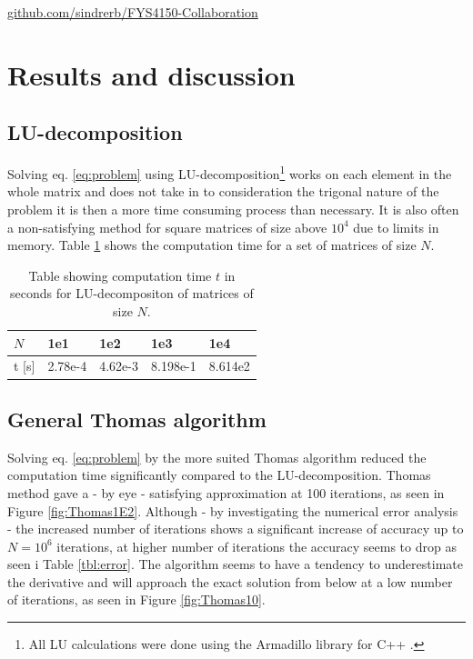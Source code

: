 \documentclass[twoside,twocolumn]{article}
\begin{document}
\begin{center}
 \href{https://github.com/sindrerb/FYS4150-Collaboration/tree/master/Doc/Project1}{github.com/sindrerb/FYS4150-Collaboration}
\end{center}

\section{Results and discussion}

\subsection{LU-decomposition}

Solving eq. \ref{eq:problem} using LU-decomposition\footnote{All LU calculations were done using the Armadillo library for C++ \cite{arma}.} works on each element in the whole matrix and does not take in to consideration the trigonal nature of the problem it is then a more time consuming process than necessary. It is also often a non-satisfying method for square matrices of size above $10^4$ due to limits in memory. Table \ref{tbl:time_LU} shows the computation time for a set of matrices of size $N$.

\begin{table}[h]
\begin{tabular}{|l|l|l|l|l|} \hline
$N$ & 1e1 & 1e2 & 1e3 & 1e4\\ \hline
t [s] & 2.78e-4 &4.62e-3 & 8.198e-1 & 8.614e2\\ \hline
\end{tabular}
\caption{Table showing computation time $t$ in seconds for LU-decompositon of matrices of size $N$.} \label{tbl:time_LU}
\end{table}



\subsection{General Thomas algorithm}

Solving eq. \ref{eq:problem} by the more suited Thomas algorithm reduced the computation time significantly compared to the LU-decomposition. Thomas method gave a - by eye - satisfying approximation at 100 iterations, as seen in Figure \ref{fig:Thomas1E2}. Although - by investigating the numerical error analysis - the increased number of iterations shows a significant increase of accuracy up to $N=10^6$ iterations, at higher number of iterations the accuracy seems to drop as seen i Table \ref{tbl:error}.
The algorithm seems to have a tendency to underestimate the derivative and will approach the exact solution from below at a low number of iterations, as seen in Figure \ref{fig:Thomas10}.
\end{document}
